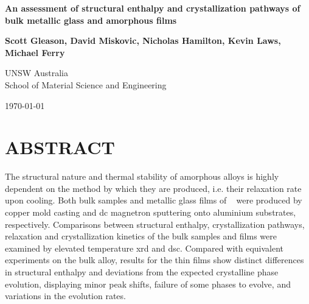 \documentclass[draft,a4paper,12pt,oneside]{article}%
\begin{document}
\thispagestyle{empty} %
\begin{titlepage}
\begin{center}
\vspace*{1cm}
	
\textbf{\LARGE{An assessment of structural enthalpy and crystallization pathways of \MgZnCa~ bulk metallic glass and amorphous films}}

\vspace{2cm}

\textbf{Scott Gleason, David Miskovic, Nicholas Hamilton, Kevin Laws, Michael Ferry}

\vspace{2cm}

UNSW Australia\\ School of Material Science and Engineering

\vspace{2cm}

\today
\end{center}
\end{titlepage}

\clearpage 
{}


\section*{ABSTRACT}

The structural nature and thermal stability of amorphous alloys is highly dependent on the method by which they are produced, i.e. their relaxation rate upon cooling.  Both bulk samples and metallic glass films of \MgZnCa~ were produced by copper mold casting and \gls{dc} magnetron sputtering onto aluminium substrates, respectively. Comparisons between structural enthalpy, crystallization pathways, relaxation and crystallization kinetics of the bulk samples and films were examined by elevated temperature \acrshort{xrd} and \acrshort{dsc}. Compared with equivalent experiments on the bulk alloy, results for the thin films show distinct differences in structural enthalpy and deviations from the expected crystalline phase evolution, displaying minor peak shifts, failure of some phases to evolve, and variations in the evolution rates. 

\end{document}
